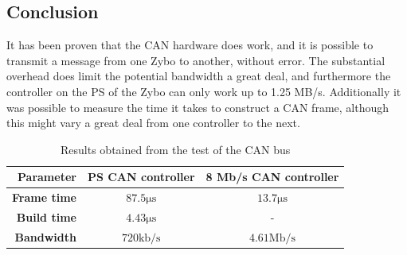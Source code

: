 \subsection{Conclusion}\label{sub:CAN_test_conclusion}
It has been proven that the CAN hardware does work, and it is possible to transmit a message from one Zybo to another, without error.
The substantial overhead does limit the potential bandwidth a great deal, and furthermore the controller on the PS of the Zybo can only work up to 1.25 MB/s. 
Additionally it was possible to measure the time it takes to construct a CAN frame, although this might vary a great deal from one controller to the next.

\begin{table}[h!]
	\centering
	\begin{tabular}{r | c | c}
		\textbf{Parameter} & \textbf{PS CAN controller} & \textbf{8 Mb/s CAN controller} \\
		\hline
		\textbf{Frame time} & $87.5 \si{\micro\second}$ & $13.7\si{\micro\second}$ \\
		\textbf{Build time} & $4.43 \si{\micro\second}$ & - \\
		\textbf{Bandwidth} & $720 \mathrm{kb/s}$ & $4.61 \mathrm{Mb/s}$
	\end{tabular}
	\caption{Results obtained from the test of the CAN bus}
	\label{tab:CAN_test_conclusion}
\end{table}
